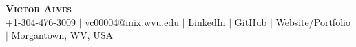 \documentclass[letterpaper,12pt]{article}
\begin{document}

\begin{center}
    \textbf{\Huge \scshape Victor Alves} \\ \vspace{3pt}
    \small
    \faMobile \hspace{.5pt} \href{tel:13044763009}{\color{blue}+1-304-476-3009}
    $|$
    \faAt \hspace{.5pt} \href{mailto:vc00004@mix.wvu.edu}{\color{blue}vc00004@mix.wvu.edu}
    $|$
    \faLinkedinSquare \hspace{.5pt} \href{https://www.linkedin.com/in/victor-alves-cheme/}{\color{blue}LinkedIn}
    $|$
    \faGithub \hspace{.5pt} \href{https://github.com/victoraalves}{\color{blue}GitHub}
    $|$
    \faGlobe \hspace{.5pt} \href{https://victor-alves.com}{\color{blue}Website/Portfolio}
    $|$
    \faMapMarker \hspace{.5pt} \href{https://www.google.com/maps/place/Engineering+Sciences+Building,+Morgantown,+WV+26505/@39.6459272,-79.9759171,17z/data=!3m1!4b1!4m6!3m5!1s0x88357b99ed193599:0x9b885a8237a27b09!8m2!3d39.6459231!4d-79.9733422!16s%2Fg%2F1q64f48kq?entry=ttu}{\color{blue}Morgantown, WV, USA}
\end{center}


\end{document}
